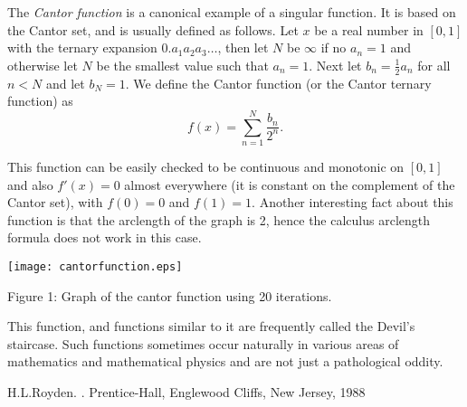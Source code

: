 \documentclass[12pt]{article}
\begin{document}
The {\em Cantor function} is a canonical example of a singular function.  It is based on the Cantor set, and is usually defined as follows.  Let $x$ be a real number in $[0,1]$ with the ternary expansion $0.a_1 a_2 a_3 \ldots$, then let $N$ be $\infty$ if no $a_n = 1$ and
otherwise let $N$ be the smallest value such that $a_n = 1$.  Next let $b_n = \frac{1}{2}a_n$ for all $n < N$ and let $b_N = 1$.  We define the Cantor function (or the Cantor ternary function) as
\begin{equation*}
f(x) = \sum_{n=1}^N \frac{b_n}{2^n}.
\end{equation*}

This function can be easily checked to be continuous and monotonic on $[0,1]$ and also $f'(x) = 0$ almost everywhere (it is constant on the complement of the Cantor set), with $f(0) = 0$ and $f(1) = 1$.  Another
interesting fact about this function is that the arclength of the graph is 2, hence the calculus arclength formula does not work in this case.

\begin{center}
\texttt{[image: cantorfunction.eps]}
\vspace*{0.1in}

{\tiny Figure 1: Graph of the cantor function using 20 iterations.}
\end{center}

This function, and functions similar to it are frequently called the Devil's staircase.  Such functions sometimes occur naturally in various areas of mathematics and mathematical physics and are not just a pathological oddity.

\begin{thebibliography}{9}
H.\@ L.\@ Royden. \emph{}. Prentice-Hall, Englewood Cliffs, New Jersey, 1988
\end{thebibliography}
\end{document}

